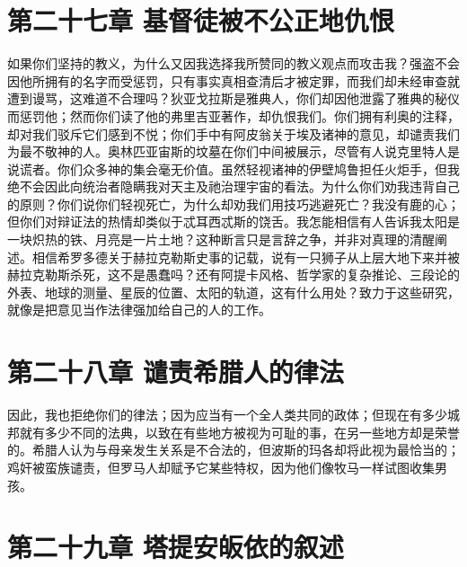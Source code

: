
\section{第二十七章 基督徒被不公正地仇恨}

如果你们坚持的教义，为什么又因我选择我所赞同的教义观点而攻击我？强盗不会因他所拥有的名字而受惩罚，只有事实真相查清后才被定罪，而我们却未经审查就遭到谩骂，这难道不合理吗？狄亚戈拉斯是雅典人，你们却因他泄露了雅典的秘仪而惩罚他；然而你们读了他的弗里吉亚著作，却仇恨我们。你们拥有利奥的注释，却对我们驳斥它们感到不悦；你们手中有阿皮翁关于埃及诸神的意见，却谴责我们为最不敬神的人。奥林匹亚宙斯的坟墓在你们中间被展示，尽管有人说克里特人是说谎者。你们众多神的集会毫无价值。虽然轻视诸神的伊壁鸠鲁担任火炬手，但我绝不会因此向统治者隐瞒我对天主及祂治理宇宙的看法。为什么你们劝我违背自己的原则？你们说你们轻视死亡，为什么却劝我们用技巧逃避死亡？我没有鹿的心；但你们对辩证法的热情却类似于忒耳西忒斯的饶舌。我怎能相信有人告诉我太阳是一块炽热的铁、月亮是一片土地？这种断言只是言辞之争，并非对真理的清醒阐述。相信希罗多德关于赫拉克勒斯史事的记载，说有一只狮子从上层大地下来并被赫拉克勒斯杀死，这不是愚蠢吗？还有阿提卡风格、哲学家的复杂推论、三段论的外表、地球的测量、星辰的位置、太阳的轨道，这有什么用处？致力于这些研究，就像是把意见当作法律强加给自己的人的工作。\par


\section{第二十八章 谴责希腊人的律法}

因此，我也拒绝你们的律法；因为应当有一个全人类共同的政体；但现在有多少城邦就有多少不同的法典，以致在有些地方被视为可耻的事，在另一些地方却是荣誉的。希腊人认为与母亲发生关系是不合法的，但波斯的玛各却将此视为最恰当的；鸡奸被蛮族谴责，但罗马人却赋予它某些特权，因为他们像牧马一样试图收集男孩。\par


\section{第二十九章 塔提安皈依的叙述}

